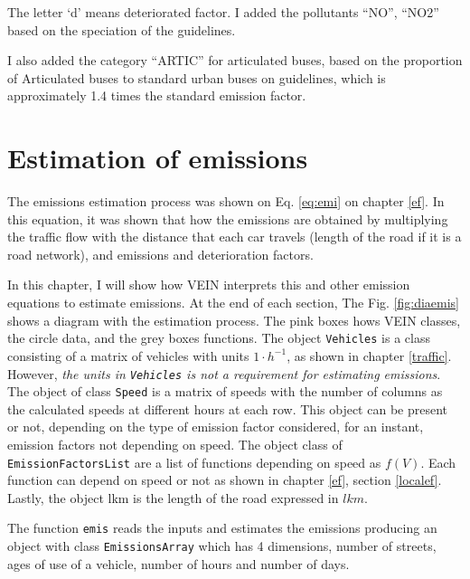 \documentclass[12pt,graybox,envcountchap,sectrefs]{krantz}
\theoremstyle{definition}
\theoremstyle{definition}
\theoremstyle{definition}
\theoremstyle{remark}
\begin{document}
The letter `d' means deteriorated factor. I added the pollutants ``NO'',
``NO2'' based on the speciation of the \citet{NtziachristosSamaras2016}
guidelines.

I also added the category ``ARTIC'' for articulated buses, based on the
proportion of Articulated buses to standard urban buses on
\citet{NtziachristosSamaras2016} guidelines, which is approximately 1.4
times the standard emission factor.

\chapter{Estimation of emissions}\label{est}

The emissions estimation process was shown on Eq. \eqref{eq:emi} on
chapter \ref{ef}. In this equation, it was shown that how the emissions
are obtained by multiplying the traffic flow with the distance that each
car travels (length of the road if it is a road network), and emissions
and deterioration factors.

In this chapter, I will show how VEIN interprets this and other emission
equations to estimate emissions. At the end of each section, The Fig.
\ref{fig:diaemis} shows a diagram with the estimation process. The pink
boxes hows VEIN classes, the circle data, and the grey boxes functions.
The object \texttt{Vehicles} is a class consisting of a matrix of
vehicles with units \(1 \cdot h^{-1}\), as shown in chapter
\ref{traffic}. However, \emph{the units in \texttt{Vehicles} is not a
requirement for estimating emissions}. The object of class
\texttt{Speed} is a matrix of speeds with the number of columns as the
calculated speeds at different hours at each row. This object can be
present or not, depending on the type of emission factor considered, for
an instant, emission factors not depending on speed. The object class of
\texttt{EmissionFactorsList} are a list of functions depending on speed
as \(f(V)\). Each function can depend on speed or not as shown in
chapter \ref{ef}, section \ref{localef}. Lastly, the object lkm is the
length of the road expressed in \(lkm\).

The function \texttt{emis} reads the inputs and estimates the emissions
producing an object with class \texttt{EmissionsArray} which has 4
dimensions, number of streets, ages of use of a vehicle, number of hours
and number of days.
\end{document}
